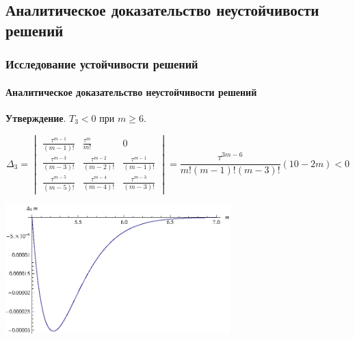 \documentclass{beamer}
\numberwithin{equation}{section}
\begin{document}
    \subsection{Аналитическое доказательство неустойчивости решений}
    \begin{frame}
        \frametitle{Исследование устойчивости решений}
        \framesubtitle{Аналитическое доказательство неустойчивости решений}

        \textbf{Утверждение}. $T_3 < 0$ при $m \geq 6$.

        \begin{equation}
            \Delta_3 = 
            \begin{vmatrix}
                \frac{\tau^{m-1}}{(m-1)!} & \frac{\tau^{m}}{m!} & 0\\
                \frac{\tau^{m-3}}{(m-3)!} & \frac{\tau^{m-2}}{(m-2)!} & \frac{\tau^{m-1}}{(m-1)!}\\
                \frac{\tau^{m-5}}{(m-5)!} & \frac{\tau^{m-4}}{(m-4)!} & \frac{\tau^{m-3}}{(m-3)!}
            \end{vmatrix} =
            \dfrac{\tau^{3m-6}}{m!(m-1)!(m-3)!} (10-2m) < 0
        \end{equation}

        \begin{center}
            \includegraphics[width=0.65\textwidth]{coefCheck.eps}
        \end{center}
    
    \end{frame}
\end{document}
